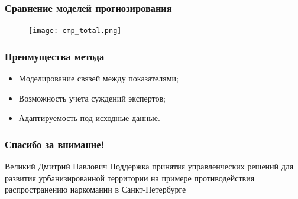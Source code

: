 \documentclass[t]{beamer}  %
\begin{document}
\begin{frame}
    \frametitle{Сравнение моделей прогнозирования}
    \begin{figure}
        \centering
        \texttt{[image: cmp\_total.png]}
    \end{figure}
\end{frame}
\begin{frame}
    \frametitle{Преимущества метода}
    \begin{itemize}
        \item Моделирование связей между показателями;
        \item Возможность учета суждений экспертов;
        \item Адаптируемость под исходные данные.
    \end{itemize}
\end{frame}
\begin{frame}
    \frametitle{Спасибо за внимание!}
    \begin{block}{Великий Дмитрий Павлович}
        Поддержка принятия управленческих решений для развития урбанизированной
        территории на примере противодействия распространению наркомании в
        Санкт-Петербурге
    \end{block}
\end{frame}
\end{document}
